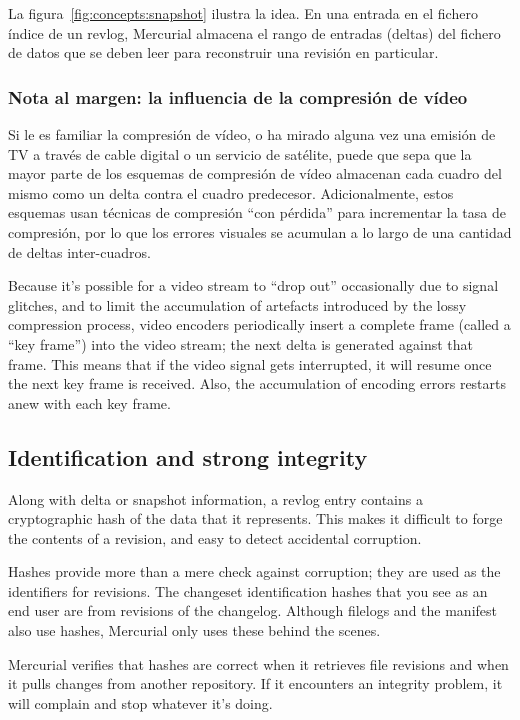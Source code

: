 La figura~\ref{fig:concepts:snapshot} ilustra la idea. En una entrada en el
fichero índice de un revlog, Mercurial almacena el rango de entradas (deltas)
del fichero de datos que se deben leer para reconstruir una revisión en
particular.

\subsubsection{Nota al margen: la influencia de la compresión de vídeo}

Si le es familiar la compresión de vídeo, o ha mirado alguna vez una emisión de
TV a través de cable digital o un servicio de satélite, puede que sepa que la 
mayor parte de los esquemas de compresión de vídeo almacenan cada cuadro del
mismo como un delta contra el cuadro predecesor. Adicionalmente, estos esquemas
usan técnicas de compresión ``con pérdida'' para incrementar la tasa de
compresión, por lo que los errores visuales se acumulan a lo largo de una
cantidad de deltas inter-cuadros.

Because it's possible for a video stream to ``drop out'' occasionally
due to signal glitches, and to limit the accumulation of artefacts
introduced by the lossy compression process, video encoders
periodically insert a complete frame (called a ``key frame'') into the
video stream; the next delta is generated against that frame.  This
means that if the video signal gets interrupted, it will resume once
the next key frame is received.  Also, the accumulation of encoding
errors restarts anew with each key frame.

\subsection{Identification and strong integrity}

Along with delta or snapshot information, a revlog entry contains a
cryptographic hash of the data that it represents.  This makes it
difficult to forge the contents of a revision, and easy to detect
accidental corruption.  

Hashes provide more than a mere check against corruption; they are
used as the identifiers for revisions.  The changeset identification
hashes that you see as an end user are from revisions of the
changelog.  Although filelogs and the manifest also use hashes,
Mercurial only uses these behind the scenes.

Mercurial verifies that hashes are correct when it retrieves file
revisions and when it pulls changes from another repository.  If it
encounters an integrity problem, it will complain and stop whatever
it's doing.

